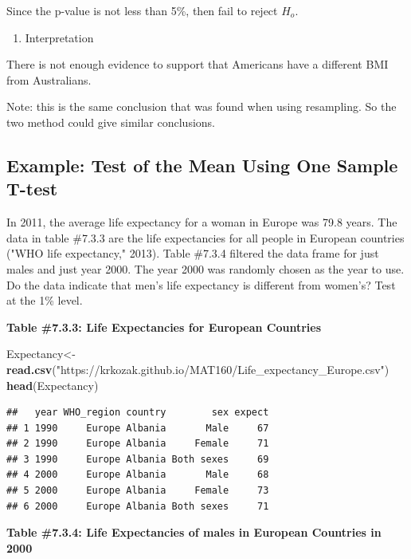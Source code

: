\documentclass[]{book}
\newenvironment{Shaded}{\begin{snugshade}}{\end{snugshade}}
\newcommand{\KeywordTok}[1]{\textcolor[rgb]{0.13,0.29,0.53}{\textbf{#1}}}
\newcommand{\NormalTok}[1]{#1}
\newcommand{\StringTok}[1]{\textcolor[rgb]{0.31,0.60,0.02}{#1}}
\providecommand{\tightlist}{%
  \setlength{\itemsep}{0pt}\setlength{\parskip}{0pt}}
\begin{document}
Since the p-value is not less than 5\%, then fail to reject \(H_o\).

\begin{enumerate}
\def\labelenumi{\arabic{enumi}.}
\setcounter{enumi}{5}
\tightlist
\item
  Interpretation
\end{enumerate}

There is not enough evidence to support that Americans have a different BMI from Australians.

Note: this is the same conclusion that was found when using resampling. So the two method could give similar conclusions.

\hypertarget{example-test-of-the-mean-using-one-sample-t-test-1}{%
\subsection{Example: Test of the Mean Using One Sample T-test}\label{example-test-of-the-mean-using-one-sample-t-test-1}}

In 2011, the average life expectancy for a woman in Europe was 79.8 years. The data in table \#7.3.3 are the life expectancies for all people in European countries ("WHO life expectancy," 2013). Table \#7.3.4 filtered the data frame for just males and just year 2000. The year 2000 was randomly chosen as the year to use. Do the data indicate that men's life expectancy is different from women's? Test at the 1\% level.

\textbf{Table \#7.3.3: Life Expectancies for European Countries}

\begin{Shaded}
\begin{Highlighting}[]
\NormalTok{Expectancy<-}\KeywordTok{read.csv}\NormalTok{(}\StringTok{"https://krkozak.github.io/MAT160/Life_expectancy_Europe.csv"}\NormalTok{)}
\KeywordTok{head}\NormalTok{(Expectancy)}
\end{Highlighting}
\end{Shaded}

\begin{verbatim}
##   year WHO_region country        sex expect
## 1 1990     Europe Albania       Male     67
## 2 1990     Europe Albania     Female     71
## 3 1990     Europe Albania Both sexes     69
## 4 2000     Europe Albania       Male     68
## 5 2000     Europe Albania     Female     73
## 6 2000     Europe Albania Both sexes     71
\end{verbatim}

\textbf{Table \#7.3.4: Life Expectancies of males in European Countries in 2000}
\end{document}
